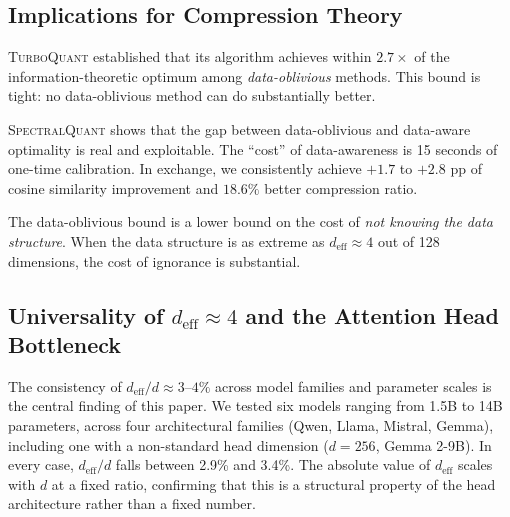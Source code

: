 \documentclass[11pt]{article}
\newcommand{\deff}{d_{\mathrm{eff}}}
\newcommand{\TQ}{\textsc{TurboQuant}}
\newcommand{\SQ}{\textsc{SpectralQuant}}
\begin{document}
\subsection{Implications for Compression Theory}

\TQ{} established that its algorithm achieves within $2.7\times$ of the
information-theoretic optimum among \emph{data-oblivious} methods.  This bound
is tight: no data-oblivious method can do substantially better.

\SQ{} shows that the gap between data-oblivious and data-aware optimality
is real and exploitable.  The ``cost'' of data-awareness is 15 seconds of
one-time calibration.  In exchange, we consistently achieve $+1.7$ to $+2.8$
pp of cosine similarity improvement and $18.6\%$ better compression ratio.

The data-oblivious bound is a lower bound on the cost of \emph{not knowing the
data structure}.  When the data structure is as extreme as $\deff \approx 4$
out of 128 dimensions, the cost of ignorance is substantial.

\subsection{Universality of \texorpdfstring{$\deff \approx 4$}{d\_eff ~= 4} and the Attention Head Bottleneck}

The consistency of $\deff/d \approx 3$--$4\%$ across model families and
parameter scales is the central finding of this paper.  We tested six models
ranging from 1.5B to 14B parameters, across four architectural families (Qwen,
Llama, Mistral, Gemma), including one with a non-standard head dimension
($d = 256$, Gemma 2-9B).  In every case, $\deff/d$ falls between 2.9\% and
3.4\%.  The absolute value of $\deff$ scales with $d$ at a fixed ratio,
confirming that this is a structural property of the head architecture rather
than a fixed number.
\end{document}
